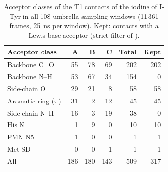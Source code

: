 \begin{table}[!htbp]
\caption{Acceptor classes of the T1 contacts of the iodine of I-Tyr in all 108 umbrella-sampling windows (11\,361 frames, 25~ns per window). Kept: contacts with a Lewis-base acceptor (strict filter of \BX{}).}
\label{tab:hiydclasses}
\centering\small
\begin{tabular}{lrrrrr}
\toprule
Acceptor class & A & B & C & Total & Kept \\
\midrule
Backbone C=O & 55 & 78 & 69 & 202 & 202 \\
Backbone N–H & 53 & 67 & 34 & 154 & 0 \\
Side-chain O & 29 & 21 & 8 & 58 & 58 \\
Aromatic ring ($\pi$) & 31 & 2 & 12 & 45 & 45 \\
Side-chain N–H & 16 & 3 & 19 & 38 & 0 \\
His N & 1 & 9 & 0 & 10 & 10 \\
FMN N5 & 1 & 0 & 0 & 1 & 1 \\
Met SD & 0 & 0 & 1 & 1 & 1 \\
\midrule
All & 186 & 180 & 143 & 509 & 317 \\
\bottomrule
\end{tabular}
\end{table}
